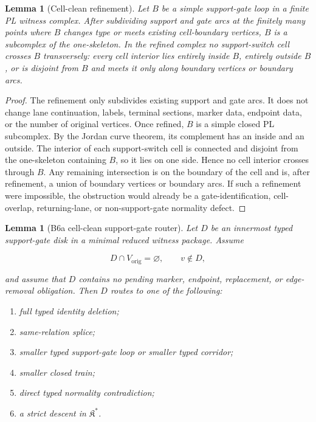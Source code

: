 \documentclass[11pt]{amsart}
\newtheorem{lemma}[theorem]{Lemma}
\theoremstyle{definition}
\begin{document}
\begin{lemma}[Cell-clean refinement]
Let \(B\) be a simple support-gate loop in a finite PL witness complex. After subdividing support and gate arcs at the finitely many points where \(B\) changes type or meets existing cell-boundary vertices, \(B\) is a subcomplex of the one-skeleton. In the refined complex no support-switch cell crosses \(B\) transversely: every cell interior lies entirely inside \(B\), entirely outside \(B\), or is disjoint from \(B\) and meets it only along boundary vertices or boundary arcs.

\end{lemma}
\begin{proof}
The refinement only subdivides existing support and gate arcs. It does not change lane continuation, labels, terminal sections, marker data, endpoint data, or the number of original vertices. Once refined, \(B\) is a simple closed PL subcomplex. By the Jordan curve theorem, its complement has an inside and an outside. The interior of each support-switch cell is connected and disjoint from the one-skeleton containing \(B\), so it lies on one side. Hence no cell interior crosses through \(B\). Any remaining intersection is on the boundary of the cell and is, after refinement, a union of boundary vertices or boundary arcs. If such a refinement were impossible, the obstruction would already be a gate-identification, cell-overlap, returning-lane, or non-support-gate normality defect.

\end{proof}
\begin{lemma}[B6a cell-clean support-gate router]
Let \(D\) be an innermost typed support-gate disk in a minimal reduced witness package. Assume

\[
D\cap V_{\mathrm{orig}}=\varnothing,\qquad v\notin D,
\]

and assume that \(D\) contains no pending marker, endpoint, replacement, or edge-removal obligation. Then \(D\) routes to one of the following:

\begin{enumerate}
\item full typed identity deletion;
\item same-relation splice;
\item smaller typed support-gate loop or smaller typed corridor;
\item smaller closed train;
\item direct typed normality contradiction;
\item a strict descent in \(\mathfrak K^\ast\).
\end{enumerate}

\end{lemma}
\end{document}
